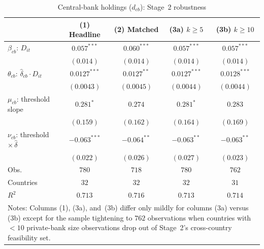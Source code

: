 \documentclass[\latexroot/\projectname]{subfiles}
\begin{document}
\begin{table}[htbp]\centering
\caption{Central-bank holdings ($d_{cb}$): Stage~2 robustness}
\label{tab:app-cb}
\setlength{\tabcolsep}{6pt}
\renewcommand{\arraystretch}{1.15}
\begin{tabular}{lcccc}
\toprule
 & (1) Headline & (2) Matched & (3a) $k\!\ge\!5$ & (3b) $k\!\ge\!10$ \\
\midrule
$\beta_{cb}$: $D_{it}$
  & $0.057^{***}$ & $0.060^{***}$ & $0.057^{***}$ & $0.057^{***}$ \\
  & $(0.014)$ & $(0.014)$ & $(0.014)$ & $(0.014)$ \\
$\theta_{cb}$: $\hat\delta_{cb}\!\cdot D_{it}$
  & $0.0127^{***}$ & $0.0127^{**}$ & $0.0127^{***}$ & $0.0128^{***}$ \\
  & $(0.0043)$ & $(0.0045)$ & $(0.0044)$ & $(0.0044)$ \\
$\mu_{cb}$: threshold slope
  & $0.281^{*}$ & $0.274$ & $0.281^{*}$ & $0.283$ \\
  & $(0.159)$ & $(0.162)$ & $(0.164)$ & $(0.169)$ \\
$\nu_{cb}$: threshold $\times\,\hat\delta$
  & $-0.063^{***}$ & $-0.064^{**}$ & $-0.063^{**}$ & $-0.063^{**}$ \\
  & $(0.022)$ & $(0.026)$ & $(0.027)$ & $(0.023)$ \\
\midrule
Obs.        & $780$ & $718$ & $780$ & $762$ \\
Countries   & $32$ & $32$ & $32$ & $31$ \\
$R^2$       & $0.713$ & $0.716$ & $0.713$ & $0.714$ \\
\bottomrule
\multicolumn{5}{p{0.9\linewidth}}{\footnotesize Notes: Columns (1), (3a), and~(3b) differ only mildly for columns (3a) versus (3b) except for the sample tightening to $762$ observations when countries with $<10$ private-bank size observations drop out of Stage~2's cross-country feasibility set.}
\end{tabular}
\end{table}
\end{document}
